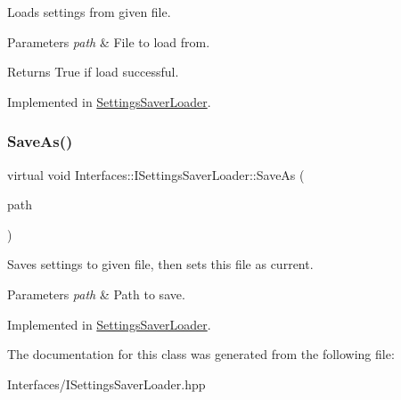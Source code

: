 Loads settings from given file. 


\begin{DoxyParams}{Parameters}
{\em path} & File to load from. \\
\hline
\end{DoxyParams}
\begin{DoxyReturn}{Returns}
True if load successful. 
\end{DoxyReturn}


Implemented in \hyperlink{class_settings_saver_loader_aaf225d7d568ce33f6350d886bb40312a}{Settings\+Saver\+Loader}.

\mbox{\label{class_interfaces_1_1_i_settings_saver_loader_a2d6a6dd6e5b6fe15e8b78af2e75725fc}} 
\subsubsection{\texorpdfstring{Save\+As()}{SaveAs()}}
{\footnotesize\ttfamily virtual void Interfaces\+::\+I\+Settings\+Saver\+Loader\+::\+Save\+As (\begin{DoxyParamCaption}\item[{Q\+String}]{path }\end{DoxyParamCaption})\hspace{0.3cm}{\ttfamily [pure virtual]}}



Saves settings to given file, then sets this file as current. 


\begin{DoxyParams}{Parameters}
{\em path} & Path to save. \\
\hline
\end{DoxyParams}


Implemented in \hyperlink{class_settings_saver_loader_a67b93496f8b0a0a779d783e967d93572}{Settings\+Saver\+Loader}.



The documentation for this class was generated from the following file\+:\begin{DoxyCompactItemize}
\item 
Interfaces/I\+Settings\+Saver\+Loader.\+hpp\end{DoxyCompactItemize}
